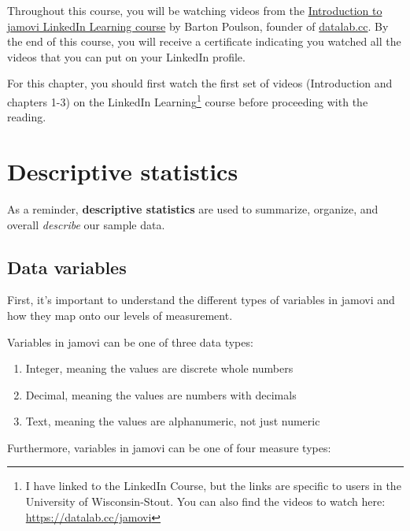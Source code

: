 \documentclass[
]{book}
\begin{document}
Throughout this course, you will be watching videos from the \href{https://www.linkedin.com/learning/introduction-to-jamovi/}{Introduction to jamovi LinkedIn Learning course} by Barton Poulson, founder of \href{https://datalab.cc/jamovi/}{datalab.cc}. By the end of this course, you will receive a certificate indicating you watched all the videos that you can put on your LinkedIn profile.

For this chapter, you should first watch the first set of videos (Introduction and chapters 1-3) on the LinkedIn Learning\footnote{I have linked to the LinkedIn Course, but the links are specific to users in the University of Wisconsin-Stout. You can also find the videos to watch here: \url{https://datalab.cc/jamovi}} course before proceeding with the reading.

\hypertarget{descriptive-statistics}{%
\section{Descriptive statistics}\label{descriptive-statistics}}

As a reminder, \textbf{descriptive statistics} are used to summarize, organize, and overall \emph{describe} our sample data.

\hypertarget{data-variables}{%
\subsection{Data variables}\label{data-variables}}

First, it's important to understand the different types of variables in jamovi and how they map onto our levels of measurement.

Variables in jamovi can be one of three data types:

\begin{enumerate}
\def\labelenumi{\arabic{enumi}.}
\item
  Integer, meaning the values are discrete whole numbers
\item
  Decimal, meaning the values are numbers with decimals
\item
  Text, meaning the values are alphanumeric, not just numeric
\end{enumerate}

Furthermore, variables in jamovi can be one of four measure types:
\end{document}
